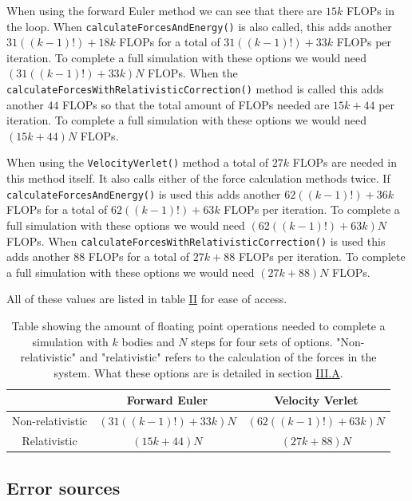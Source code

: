 \documentclass[reprint,english,notitlepage]{revtex4-1}  %
\begin{document}
When using the forward Euler method we can see that there are $15k$ FLOPs in the loop. When \verb+calculateForcesAndEnergy()+ is also called, this adds another $31((k-1)!) + 18k$ FLOPs for a total of $31((k-1)!) + 33k$ FLOPs per iteration. To complete a full simulation with these options we would need $(31((k-1)!) + 33k)N$ FLOPs. When the \verb+calculateForcesWithRelativisticCorrection()+ method is called this adds another $44$ FLOPs so that the total amount of FLOPs needed are $15k + 44$ per iteration. To complete a full simulation with these options we would need $(15k + 44)N$ FLOPs.  

When using the \verb+VelocityVerlet()+ method a total of $27k$ FLOPs are needed in this method itself. It also calls either of the force calculation methods twice. If \verb+calculateForcesAndEnergy()+ is used this adds another $62((k-1)!) + 36k$ FLOPs for a total of $62((k-1)!) + 63k$ FLOPs per iteration. To complete a full simulation with these options we would need $(62((k-1)!) + 63k)N$ FLOPs. When \verb+calculateForcesWithRelativisticCorrection()+ is used this adds another $88$ FLOPs for a total of $27k + 88$ FLOPs per iteration. To complete a full simulation with these options we would need $(27k + 88)N$ FLOPs.

All of these values are listed in table \hyperref[table:III:b:i]{II} for ease of access. \newline

\begin{table}[h!] \label{table:III:b:i}
\caption{Table showing the amount of floating point operations needed to complete a simulation with $k$ bodies and $N$ steps for four sets of options. "Non-relativistic" and "relativistic" refers to the calculation of the forces in the system. What these options are is detailed in section \hyperref[sec:III:a]{III.A}.}
\begin{tabular}{|c|c|c|}
\hline
 & Forward Euler & Velocity Verlet \\
\hline 
Non-relativistic & $(31((k-1)!) + 33k)N$ & $(62((k-1)!) + 63k)N$ \\
Relativistic & $(15k + 44)N$ & $(27k + 88)N$ \\
\hline
\end{tabular}
\end{table} 


\subsection{Error sources} \label{sec:III:c}
\end{document}
